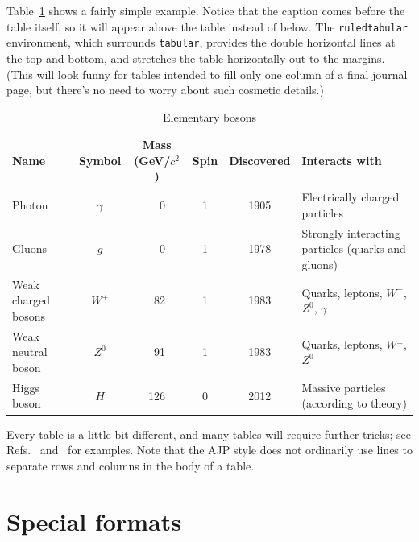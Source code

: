 \documentclass[prb,preprint]{revtex4-1}
\begin{document}
Table~\ref{bosons} shows a fairly simple example.  Notice that the caption comes
before the table itself, so it will appear above the table instead of below.
The \texttt{ruledtabular} environment, which surrounds \texttt{tabular},
provides the double horizontal lines at the top and bottom, and stretches
the table horizontally out to the margins.  (This will look funny for tables
intended to fill only one column of a final journal page, but there's no 
need to worry about such cosmetic details.)

\begin{table}[h!]
\centering
\caption{Elementary bosons}
\begin{ruledtabular}
\begin{tabular}{l c c c c p{5cm}}
Name & Symbol & Mass (GeV/$c^2$) & Spin & Discovered & Interacts with \\
\hline	%
Photon & $\gamma$ & \ \ 0 & 1 & 1905 & Electrically charged particles \\
Gluons & $g$ & \ \ 0 & 1 & 1978 & Strongly interacting particles (quarks and gluons) \\
Weak charged bosons & $W^\pm$ & \ 82 & 1 & 1983 & Quarks, leptons, $W^\pm$, $Z^0$, $\gamma$ \\
Weak neutral boson & $Z^0$ & \ 91 & 1 & 1983 & Quarks, leptons, $W^\pm$, $Z^0$ \\
Higgs boson & $H$ & 126 & 0 & 2012 & Massive particles (according to theory) \\
\end{tabular}
\end{ruledtabular}
\label{bosons}
\end{table}

Every table is a little bit different, and many tables will require
further tricks; see Refs.\  and~
for examples.  Note that the AJP style does not ordinarily use lines 
to separate rows and columns in the body of a table.


\section{Special formats}
\end{document}
